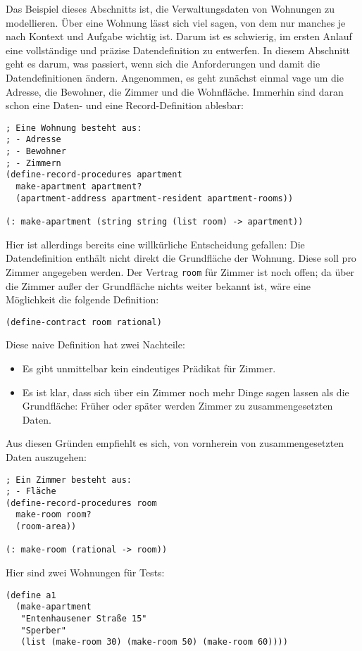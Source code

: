 Das Beispiel dieses Abschnitts ist, die Verwaltungsdaten von Wohnungen
zu modellieren. Über eine Wohnung lässt sich viel sagen, von dem nur
manches je nach Kontext und Aufgabe wichtig ist.  Darum ist es
schwierig, im ersten Anlauf eine vollständige und präzise
Datendefinition zu entwerfen.  In diesem Abschnitt geht es darum, was
passiert, wenn sich die Anforderungen und damit die Datendefinitionen
ändern.  Angenommen, es geht zunächst einmal vage um die Adresse, die
Bewohner, die Zimmer und die Wohnfläche.  Immerhin sind daran schon
eine Daten- und eine Record-Definition ablesbar:
%
\begin{verbatim}
; Eine Wohnung besteht aus:
; - Adresse
; - Bewohner
; - Zimmern
(define-record-procedures apartment
  make-apartment apartment?
  (apartment-address apartment-resident apartment-rooms))

(: make-apartment (string string (list room) -> apartment))
\end{verbatim}
%
Hier ist allerdings bereits eine willkürliche Entscheidung gefallen:
Die Datendefinition enthält nicht direkt die Grundfläche der Wohnung.
Diese soll pro Zimmer angegeben werden.  Der Vertrag \texttt{room} für
Zimmer ist noch offen; da über die Zimmer außer der Grundfläche nichts
weiter bekannt ist, wäre eine Möglichkeit die folgende Definition:
%
\begin{verbatim}
(define-contract room rational)
\end{verbatim}
%
Diese naive Definition hat zwei Nachteile:
%
\begin{itemize}
\item Es gibt unmittelbar kein eindeutiges Prädikat für Zimmer.
\item Es ist klar, dass sich über ein Zimmer noch mehr Dinge sagen
  lassen als die Grundfläche: Früher oder später werden Zimmer zu
  zusammengesetzten Daten.
\end{itemize}
%
Aus diesen Gründen empfiehlt es sich, von vornherein von
zusammengesetzten Daten auszugehen:
%
\begin{verbatim}
; Ein Zimmer besteht aus:
; - Fläche
(define-record-procedures room
  make-room room?
  (room-area))

(: make-room (rational -> room))
\end{verbatim}
%
Hier sind zwei Wohnungen für Tests:
%
\begin{verbatim}
(define a1
  (make-apartment
   "Entenhausener Straße 15"
   "Sperber"
   (list (make-room 30) (make-room 50) (make-room 60))))
\end{verbatim}
